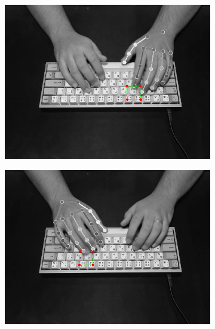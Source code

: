 \documentclass[preprint,12pt,authoryear]{elsarticle}
\begin{document}
\begin{figure}[h]
	\centering
	\begin{subfigure}{.33\textwidth}
		\centering
		\includegraphics[width=.995\linewidth]{failure-3.png}
	\end{subfigure}%
	\begin{subfigure}{.33\textwidth}
		\centering
		\includegraphics[width=.995\linewidth]{failure-1.png}
	\end{subfigure}%
	\begin{subfigure}{.33\textwidth}
		\centering

\end{subfigure}
\end{figure}
\end{document}
